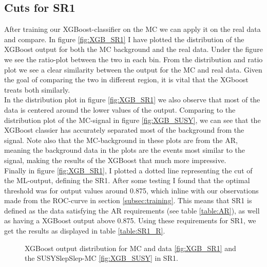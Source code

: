 \documentclass{article}
\begin{document}
\subsection{Cuts for SR1}
After training our XGBoost-classifier on the MC we can apply it on the real data and compare. In figure \ref{fig:XGB_SR1} I have plotted the distribution of the XGBoost output for both the MC background and the real data. Under the figure we see the ratio-plot between the two in each bin. From the distribution and ratio plot we see a clear similarity between the output for the MC and real data. Given the goal of comparing the two in different region, it is vital that the XGboost treats both similarly.
\\
In the distribution plot in figure \ref{fig:XGB_SR1} we also observe that most of the data is centered around the lower values of the output. Comparing to the distribution plot of the MC-signal in figure \ref{fig:XGB_SUSY}, we can see that the XGBoost classier has accurately separated most of the background from the signal. Note also that the MC-background in these plots are from the AR, meaning the background data in the plots are the events most similar to the signal, making the results of the XGBoost that much more impressive. 
\\
Finally in figure \ref{fig:XGB_SR1}, I plotted a dotted line representing the cut of the ML-output, defining the SR1. After some testing I found that the optimal threshold was for output values around 0.875, which inline with our observations made from the ROC-curve in section \ref{subsec:training}. This means that SR1 is defined as the data satisfying the AR requirements (see table \ref{table:AR}), as well as having a XGBoost output above 0.875. Using these requirements for SR1, we get the results as displayed in table \ref{table:SR1_R}.
\\
\begin{figure}
    \caption{XGBoost output distribution for MC and data \ref{fig:XGB_SR1} and the SUSYSlepSlep-MC \ref{fig:XGB_SUSY} in SR1.}
\end{figure}
\end{document}

